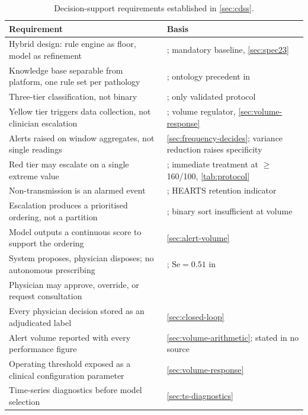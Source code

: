 \documentclass[12pt,a4paper,oneside]{report}
\begin{document}
\begin{table}[htbp]
\centering\footnotesize
\caption{Decision-support requirements established in \cref{sec:cdss}.}\label{tab:spec24}
\begin{tabularx}{\textwidth}{@{}X >{\raggedright\arraybackslash}p{5.9cm}@{}}
\toprule
\textbf{Requirement} & \textbf{Basis} \\
\midrule
Hybrid design: rule engine as floor, model as refinement & \textcite{liu2025review}; mandatory baseline, \cref{sec:spec23} \\
Knowledge base separable from platform, one rule set per pathology & \textcite{yazdani2018}; ontology precedent in \textcite{liu2025review} \\
Three-tier classification, not binary & \textcite{mihevc2025}; only validated protocol \\
Yellow tier triggers data collection, not clinician escalation & \textcite{mihevc2025}; volume regulator, \cref{sec:volume-response} \\
Alerts raised on window aggregates, not single readings & \cref{sec:frequency-decides}; variance reduction raises specificity \\
Red tier may escalate on a single extreme value & \textcite{mihevc2025}; immediate treatment at $\geq$ 160/100, \cref{tab:protocol} \\
Non-transmission is an alarmed event & \textcite{yazdani2018}; HEARTS retention indicator \\
Escalation produces a prioritised ordering, not a partition & \textcite{yazdani2018}; binary sort insufficient at volume \\
Model outputs a continuous score to support the ordering & \cref{sec:alert-volume} \\
System proposes, physician disposes; no autonomous prescribing & \textcite{yazdani2018}; $\mathrm{Se} = 0.51$ in \textcite{mendoza2025} \\
Physician may approve, override, or request consultation & \textcite{yazdani2018} \\
Every physician decision stored as an adjudicated label & \cref{sec:closed-loop} \\
Alert volume reported with every performance figure & \cref{sec:volume-arithmetic}; stated in no source \\
Operating threshold exposed as a clinical configuration parameter & \cref{sec:volume-response} \\
Time-series diagnostics before model selection & \cref{sec:ts-diagnostics} \\

\end{tabularx}
\end{table}
\end{document}
